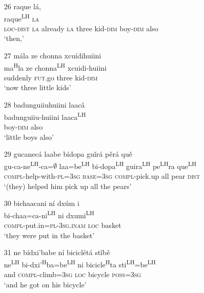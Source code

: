 \begin{itemize}
\item[26]
\glll raque l\'{a},\\
raque\textsuperscript{LH} \textsc{la}\\
\textsc{loc}-\textsc{dist} \textsc{la} already \textsc{la} { } three kid-\textsc{dim} boy-\textsc{dim} also\\
\glt `then,'


\item[27]
\glll m\'{a}la ze chonna xcu\'{i}dihuiini\\
ma\textsuperscript{H}la ze chonna\textsuperscript{LH} xcuidi-huiini\\
suddenly \textsc{fut}.go three kid-\textsc{dim}\\
\glt `now three little kids'


\item[28]
\glll badunguiiuhuiini laac\v{a}\\
badunguiiu-huiini laaca\textsuperscript{LH}\\
boy-\textsc{dim} also\\
\glt `little boys also'


\item[29]
\glll gucanec\'{a} laabe b\'{i}dopa gu\v{i}r\'{a} p\v{e}r\'{a} qu\v{e}\\
gu-ca-ne\textsuperscript{LH}-ca=$\emptyset$ laa=be\textsuperscript{LH} bi-dopa\textsuperscript{LH} guira\textsuperscript{LH} pe\textsuperscript{LH}ra que\textsuperscript{LH}\\
\textsc{compl}-help-with-\textsc{pl}=\textsc{3sg} \textsc{base}=\textsc{3sg} \textsc{compl}-pick.up all pear \textsc{dist}\\
\glt `(they) helped him pick up all the pears'
 

\item[30]
\glll bichaacani n\'{i} dx\'{u}m\v{ i}\\
bi-chaa=ca-ni\textsuperscript{LH} ni dxumi\textsuperscript{LH}\\
\textsc{compl}-put.in=\textsc{pl}-\textsc{3sg.inam} \textsc{loc} basket\\
\glt `they were put in the basket'
 

\item[31]
\glll ne b\'{i}dxi'babe n\'{i} bicicl\'{e}t\'{a} st\v{i}b\v{e}\\
ne\textsuperscript{LH} bi-dxi'\textsuperscript{H}ba=be\textsuperscript{LH} ni bicicle\textsuperscript{H}ta sti\textsuperscript{LH}=be\textsuperscript{LH}\\
and \textsc{compl}-climb=\textsc{3sg} \textsc{loc} bicycle \textsc{poss}=\textsc{3sg}\\
\glt `and he got on his bicycle'



\end{itemize}

